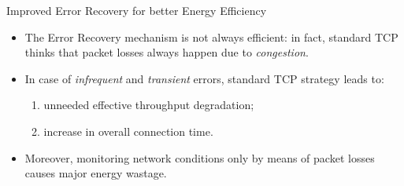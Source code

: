 \begin{frame}{Improved Error Recovery for \newline better Energy Efficiency}
    \begin{itemize}
	\item The Error Recovery mechanism is not always efficient:
	      in fact, standard TCP thinks that packet losses always happen due to
	      \textit{congestion}.
	\item In case of \textit{infrequent} and \textit{transient} errors,
	      standard TCP strategy leads to:
	      \begin{enumerate}
	      	\item unneeded effective throughput degradation;
		\item increase in overall connection time.
	      \end{enumerate}
	\item Moreover, monitoring network conditions only by means of
	      packet losses causes major energy wastage.
    \end{itemize}
\end{frame}
